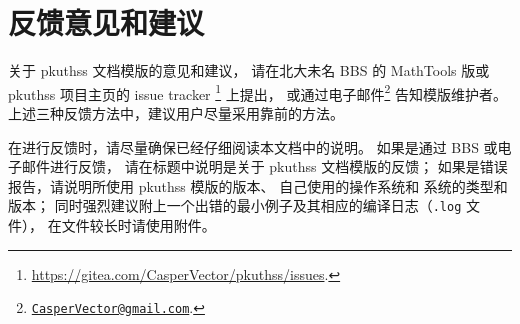 \section{反馈意见和建议}

关于 pkuthss 文档模版的意见和建议，
请在北大未名 BBS 的 MathTools 版或 pkuthss 项目主页的 issue tracker%
\footnote{\url{https://gitea.com/CasperVector/pkuthss/issues}.}%
上提出，
或通过电子邮件\footnote%
{\href{mailto:CasperVector@gmail.com}{\texttt{CasperVector@gmail.com}}.}%
告知模版维护者。
上述三种反馈方法中，建议用户尽量采用靠前的方法。

在进行反馈时，请尽量确保已经仔细阅读本文档中的说明。
如果是通过 BBS 或电子邮件进行反馈，
请在标题中说明是关于 pkuthss 文档模版的反馈；
如果是错误报告，请说明所使用 pkuthss 模版的版本、
自己使用的操作系统和  系统的类型和版本；
同时强烈建议附上一个出错的最小例子及其相应的编译日志（\verb|.log| 文件），
在文件较长时请使用附件。

